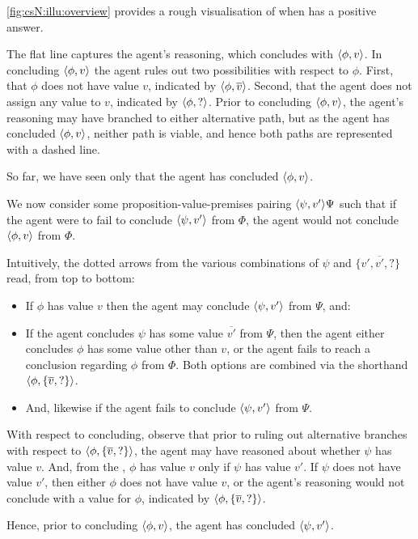 \begin{note}[Figure]
  \autoref{fig:csN:illu:overview} provides a rough visualisation of when \qzS{} has a positive answer.

  The flat line captures the agent's reasoning, which concludes with \(\langle \phi, v \rangle\).
  In concluding \(\langle \phi, v \rangle\) the agent rules out two possibilities with respect to \(\phi\).
  First, that \(\phi\) does not have value \(v\), indicated by \(\langle \phi, \overline{v} \rangle\).
  Second, that the agent does not assign any value to \(v\), indicated by \(\langle \phi, ? \rangle\).
  Prior to concluding \(\langle \phi, v \rangle\), the agent's reasoning may have branched to either alternative path, but as the agent has concluded \(\langle \phi, v \rangle\), neither path is viable, and hence both paths are represented with a dashed line.

  So far, we have seen only that the agent has concluded \(\langle \phi, v \rangle\).

  We now consider some proposition-value-premises pairing \(\langle \psi, v' \rangle{\Psi}\) such that if the agent were to fail to conclude \(\langle \psi, v' \rangle\) from \(\Phi\), the agent would not conclude \(\langle \phi, v \rangle\) from \(\Phi\).

  Intuitively, the dotted arrows from the various combinations of \(\psi\) and \(\{v',\overline{v'},?\}\) read, from top to bottom:
  \begin{itemize}
  \item If \(\phi\) has value \(v\) then the agent may conclude \(\langle \psi, v' \rangle\) from \(\Psi\), and:
  \item If the agent concludes \(\psi\) has some value \(\overline{v'}\) from \(\Psi\), then the agent either concludes \(\phi\) has some value other than \(v\), or the agent fails to reach a conclusion regarding \(\phi\) from \(\Phi\).
    Both options are combined via the shorthand \(\langle \phi, \{\overline{v},?\} \rangle\).
  \item
    And, likewise if the agent fails to conclude \(\langle \psi, v' \rangle\) from \(\Psi\).
  \end{itemize}

  With respect to concluding, observe that prior to ruling out alternative branches with respect to \(\langle \phi, \{\overline{v},?\} \rangle\), the agent may have reasoned about whether \(\psi\) has value \(v\).
  And, from the \agpe{}, \(\phi\) has value \(v\) only if \(\psi\) has value \(v'\).
  If \(\psi\) does not have value \(v'\), then either \(\phi\) does not have value \(v\), or the agent's reasoning would not conclude with a value for \(\phi\), indicated by \(\langle \phi, \{\overline{v},?\} \rangle\).

  Hence, prior to concluding \(\langle \phi, v \rangle\), the agent has concluded \(\langle \psi, v' \rangle\).
\end{note}

